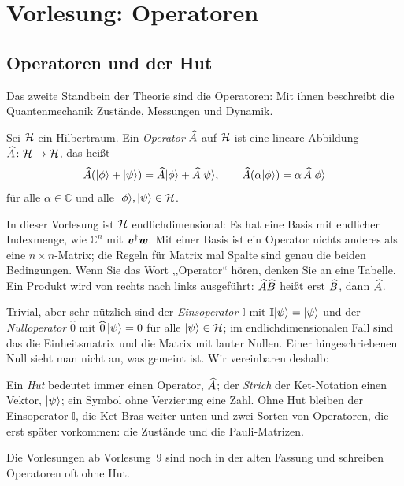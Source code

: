 
\section{Vorlesung: Operatoren}

\subsection{Operatoren und der Hut}
Das zweite Standbein der Theorie sind die Operatoren: Mit ihnen beschreibt die Quantenmechanik Zustände, Messungen und Dynamik.
\begin{definition}
	Sei $\mathcal{H}$ ein Hilbertraum. Ein \emph{Operator} $\widehat{A}$ auf $\mathcal{H}$ ist eine lineare Abbildung $\widehat{A}\colon\mathcal{H} \to \mathcal{H}$, das heißt
\begin{equation}
	\widehat{A}(\lvert \phi \rangle + \lvert \psi \rangle) = \widehat{A}\lvert \phi \rangle + \widehat{A}\lvert \psi \rangle, \qquad
	\widehat{A}(\alpha\lvert \phi \rangle) = \alpha\,\widehat{A}\lvert \phi \rangle
\end{equation}
für alle $\alpha\in\mathbb{C}$ und alle $\lvert \phi \rangle,\lvert \psi \rangle\in\mathcal{H}$.
\end{definition}

In dieser Vorlesung ist $\mathcal{H}$ endlichdimensional: Es hat eine Basis mit endlicher Indexmenge, wie $\mathbb{C}^n$ mit $\boldsymbol{v}^{\dagger}\boldsymbol{w}$. Mit einer Basis ist ein Operator nichts anderes als eine $n\times n$-Matrix; die Regeln für Matrix mal Spalte sind genau die beiden Bedingungen. Wenn Sie das Wort ,,Operator`` hören, denken Sie an eine Tabelle. Ein Produkt wird von rechts nach links ausgeführt: $\widehat{A}\widehat{B}$ heißt erst $\widehat{B}$, dann $\widehat{A}$.

Trivial, aber sehr nützlich sind der \emph{Einsoperator} $\mathbb{I}$ mit $\mathbb{I}\lvert \psi \rangle = \lvert \psi \rangle$ und der \emph{Nulloperator} $\widehat{0}$ mit $\widehat{0}\,\lvert \psi \rangle = 0$ für alle $\lvert \psi \rangle\in\mathcal{H}$; im endlichdimensionalen Fall sind das die Einheitsmatrix und die Matrix mit lauter Nullen. Einer hingeschriebenen Null sieht man nicht an, was gemeint ist. Wir vereinbaren deshalb:

\begin{merksatz}[Notation]
	Ein \emph{Hut} bedeutet immer einen Operator, $\widehat{A}$; der \emph{Strich} der Ket-Notation einen Vektor, $\lvert \psi \rangle$; ein Symbol ohne Verzierung eine Zahl. Ohne Hut bleiben der Einsoperator $\mathbb{I}$, die Ket-Bras weiter unten und zwei Sorten von Operatoren, die erst später vorkommen: die Zustände und die Pauli-Matrizen.
\end{merksatz}
Die Vorlesungen ab Vorlesung~9 sind noch in der alten Fassung und schreiben Operatoren oft ohne Hut.


